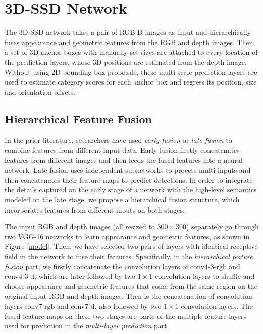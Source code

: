 \documentclass[10pt,twocolumn,letterpaper]{article}
\begin{document}
	
	\section{3D-SSD Network}
	
	The 3D-SSD network takes a pair of RGB-D images as input and hierarchically fuses appearance and geometric features from the RGB and depth images. Then, a set of 3D anchor boxes with manually-set sizes are attached to every location of the prediction layers, whose 3D positions are estimated from the depth image. Without using 2D bounding box proposals, these multi-scale prediction layers are used to estimate category scores for each anchor box and regress its position, size and orientation offsets.
	
	\subsection{Hierarchical Feature Fusion}
	
	In the prior literature, researchers have used \emph{early fusion} \cite{Cai2016early} or \emph{late fusion}\cite{Suran2016DSS} \cite{Deng2017} to combine features from different input data. Early fusion firstly concatenates features from different images and then feeds the fused features into a neural network. Late fusion uses independent subnetworks to process multi-inputs and then concatenates their feature maps to predict detections. In order to integrate the details captured on the early stage of a network with the high-level semantics modeled on the late stage, we propose a hierarchical fusion structure, which incorporates features from different inputs on both stages.\par
	
	The input RGB and depth images (all resized to $300\times300$) separately go through two VGG-16 networks to learn appearance and geometric features, as shown in Figure \ref{model}. Then, we have selected two pairs of layers with identical receptive field in the network to fuse their features. 
	Specifically, in the \emph{hierarchical feature fusion} part, we firstly concatenate the convolution layers of conv4-3-rgb and conv4-3-d, which are later followed by two $1\times1$ convolution layers to shuffle and choose appearance and geometric features that come from the same region on the original input RGB and depth images. Then is the concatenation of convolution layers conv7-rgb and conv7-d, also followed by two $1\times1$ convolution layers. The fused feature maps on these two stages are parts of the multiple feature layers used for prediction in the \emph{multi-layer prediction} part. \par
	
\end{document}
